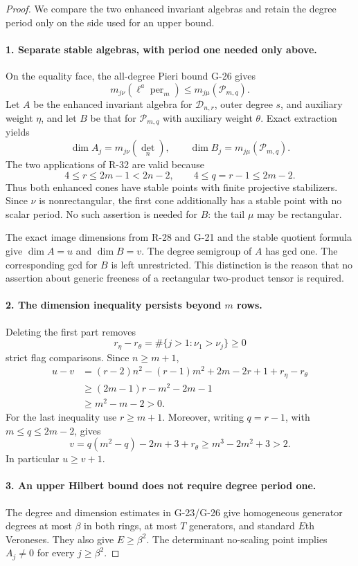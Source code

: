 \begin{proof}
We compare the two enhanced invariant algebras and retain the
degree period only on the side used for an upper bound.
\paragraph{1. Separate stable algebras, with period one needed only above.}
On the equality face, the all-degree Pieri bound G-26 gives
\[
 m_{j\nu}(\ell^a\operatorname{per}_m)
       \le m_{j\mu}(\mathcal P_{m,q}).
\]
Let $A$ be the enhanced invariant algebra for
$\mathcal D_{n,r}$, outer degree $s$, and auxiliary weight
$\eta$, and let $B$ be that for $\mathcal P_{m,q}$ with
auxiliary weight $\theta$. Exact extraction yields
\[
 \dim A_j=m_{j\nu}(\det_n),\qquad
 \dim B_j=m_{j\mu}(\mathcal P_{m,q}).
\]
The two applications of R-32 are valid because
\[
 4\le r\le2m-1<2n-2,\qquad
 4\le q=r-1\le2m-2.
\]
Thus both enhanced cones have stable points with finite
projective stabilizers. Since $\nu$ is nonrectangular, the
first cone additionally has a stable point with no scalar
period. No such assertion is needed for $B$: the tail $\mu$
may be rectangular.

The exact image dimensions from R-28 and G-21 and the stable
quotient formula give $\dim A=u$ and $\dim B=v$.
The degree semigroup of $A$ has gcd one. The corresponding
gcd for $B$ is left unrestricted. This distinction is the
reason that no assertion about generic freeness of a
rectangular two-product tensor is required.

\paragraph{2. The dimension inequality persists beyond $m$ rows.}
Deleting the first part removes
\[
 r_\eta-r_\theta=\#\{j>1:\nu_1>\nu_j\}\ge0
\]
strict flag comparisons. Since $n\ge m+1$,
\[
 \begin{aligned}
 u-v
  &=(r-2)n^2-(r-1)m^2+2m-2r+1+r_\eta-r_\theta\\
  &\ge(2m-1)r-m^2-2m-1\\
  &\ge m^2-m-2>0.
 \end{aligned}
\]
For the last inequality use $r\ge m+1$. Moreover, writing
$q=r-1$, with $m\le q\le2m-2$, gives
\[
 v=q(m^2-q)-2m+3+r_\theta
        \ge m^3-2m^2+3>2.
\]
In particular $u\ge v+1$.

\paragraph{3. An upper Hilbert bound does not require degree period one.}
The degree and dimension estimates in G-23/G-26 give
homogeneous generator degrees at most $\beta$ in both rings,
at most $T$ generators, and standard $E$th Veroneses.
They also give $E\ge\beta^2$. The determinant no-scaling
point implies $A_j\ne0$ for every $j\ge\beta^2$.


\end{proof}
